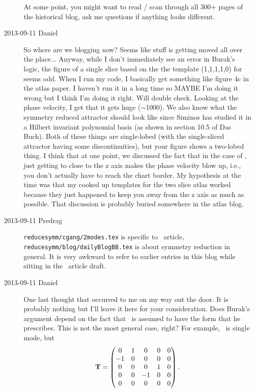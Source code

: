 \begin{description}
At some point, you might want to read / scan through
all 300+ pages of the historical blog, ask me
questions if anything looks different.

\item[2013-09-11 Daniel] So where are we blogging now? Seems like
stuff is getting moved all over the place... Anyway, while I don't
immediately see an error in Burak's logic, the figure of a single
slice based on the the template (1,1,1,1,0) for \cLf\, seems odd.
When I run my code, I basically get something like figure 4c in the
atlas paper. I haven't run it in a long time so MAYBE I'm doing it
wrong but I think I'm doing it right. Will double check. Looking at
the phase velocity, I get that it gets huge ($\sim$1000). We also
know what the symmetry reduced attractor should look like since
Siminos has studied it in a Hilbert invariant polynomial basis (as
shown in section 10.5 of Das Buch). Both of these things are
single-lobed (with the single-sliced attractor having some
discontinuities), but your figure shows a two-lobed thing. I think
that at one point, we discussed the fact that in the case of \cLf,
just getting to close to the z axis makes the phase velocity blow up,
i.e., you don't actually have to reach the chart border. My
hypothesis at the time was that my cooked up templates for the two
slice atlas worked because they just happened to keep you away from
the z axis as much as possible. That discussion is probably buried
somewhere in the atlas blog.

\item[2013-09-11 Predrag]
\texttt{reducesymm/cgang/2modes.tex} is specific to \twoMode\ article,
\texttt{reducesymm/blog/dailyBlogBB.tex} is about symmetry reduction
in general. It is very awkward to refer to earlier entries in this blog
while sitting in the \twoMode\ article draft.

\item[2013-09-11 Daniel] One last thought that occurred to me on my
way out the door. It is probably nothing but I'll leave it here for
your consideration. Does Burak's argument depend on the fact that
\Lg\ is assumed to have the form that he prescribes. This is not the
most general case, right? For example, \cLf\ is single mode, but
\[
	\mathbf{T} =  \begin{pmatrix}
			 0  & 1 & 0 & 0 & 0\\
			 -1 & 0 & 0 & 0 & 0\\
			 0  & 0 & 0 & 1 & 0\\
			 0 & 0 & -1 & 0 & 0\\
			 0 & 0 & 0 & 0 & 0\\
			\end{pmatrix} .
\]


\end{description}
